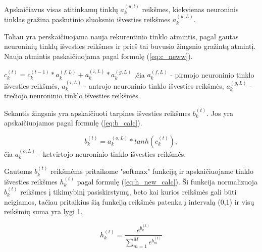 Apskaičiavus visas atitinkamų tinklų \begin{math}a_k^{(u,l)}\end{math} reikšmes, kiekvienas neuroninis tinklas gražina paskutinio sluoksnio išvesties reikšmes \begin{math}a_k^{(u,L)}\end{math}.

Toliau yra perskaičiuojama nauja rekurentinio tinklo atmintis, pagal gautas neuroninių tinklų išvesties reikšmes ir prieš tai buvusio žingsnio gražintą atmintį. Nauja atmintis paskaičiuojama pagal formulę (\ref{eq:c_neww}).

\begin{math}\label{eq:c_neww}
  c_k^{(t)} = c_k^{(t-1)} * a_k^{(f,L)} + a_k^{(i,L)} * a_k^{(g,L)}
\end{math}
,čia \begin{math}a_k^{(f,L)}\end{math} - pirmojo neuroninio tinklo išvesties reikšmės, \begin{math}a_k^{(i,L)}\end{math} - antrojo neuroninio tinklo išvesties reikšmės, \begin{math}a_k^{(g,L)}\end{math} - trečiojo neuroninio tinklo išvesties reikšmės.

Sekantis žingsnis yra apskaičiuoti tarpines išvesties reikšmes \begin{math}b_k^{(t)}\end{math}. Jos yra apskaičiuojamos pagal formulę (\ref{eq:b_calc}).

\begin{equation}\label{eq:b_calc}
  b_k^{(t)} = a_k^{(o,L)}*tanh(c_k^{(t)}),
\end{equation}
čia \begin{math}a_k^{(o,L)}\end{math} - ketvirtojo neuroninio tinklo išvesties reikšmės.

Gautoms \begin{math}b_k^{(t)}\end{math} reikšmėms pritaikome "softmax" funkciją ir apskaičiuojame tinklo išvesties reikšmes \begin{math}h_k^{(t)}\end{math} pagal formulę (\ref{eq:h_new_calc}). Ši funkcija normalizuoja \begin{math}b_k^{(t)}\end{math} reikšmes į tikimybinį pasiskirstymą, beto kai kurios reikšmės gali būti neigiamos, tačiau pritaikius šią funkciją reikšmės patenka į intervalą (0,1) ir visų reikšmių suma yra lygi 1.

\begin{equation}\label{eq:h_new_calc}
  h_k^{(t)} = \frac{e^{b_k^{(t)}}}{\sum_{m=1}^M e^{b_m^{(t)}}}
\end{equation}
